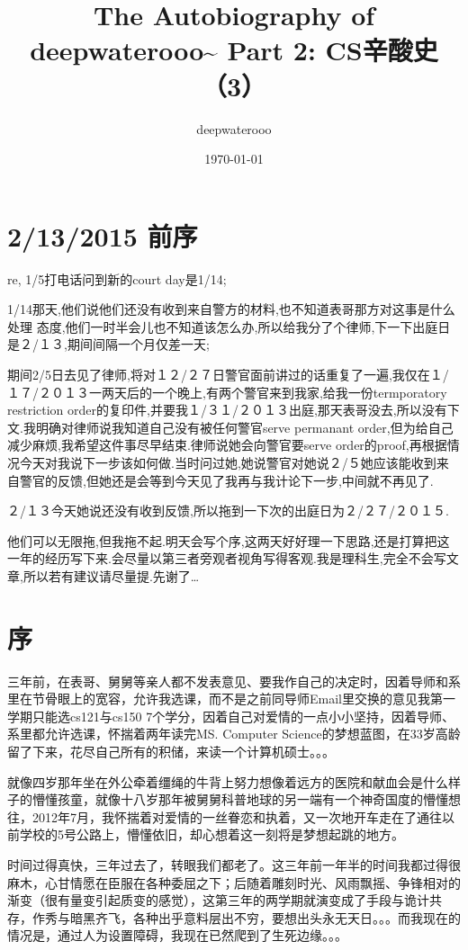 \documentclass[12pt]{book}
\author{deepwaterooo}
\date{\today}
\title{The Autobiography of deepwaterooo\textasciitilde{} \linebreak Part 2: CS辛酸史（3）}
\begin{document}
\maketitle
\tableofcontents


\chapter{2/13/2015 前序}
\label{sec-1}

re, 1/5打电话问到新的court day是1/14;

1/14那天,他们说他们还没有收到来自警方的材料,也不知道表哥那方对这事是什么处理  态度,他们一时半会儿也不知道该怎么办,所以给我分了个律师,下一下出庭日是２/１３,期间间隔一个月仅差一天;

期间2/5日去见了律师,将对１２/２７日警官面前讲过的话重复了一遍,我仅在１/１７/２０１３一两天后的一个晚上,有两个警官来到我家,给我一份termporatory restriction order的复印件,并要我１/３１/２０１３出庭,那天表哥没去,所以没有下文.我明确对律师说我知道自己没有被任何警官serve permanant order,但为给自己减少麻烦,我希望这件事尽早结束.律师说她会向警官要serve order的proof,再根据情况今天对我说下一步该如何做.当时问过她,她说警官对她说２/５她应该能收到来自警官的反馈,但她还是会等到今天见了我再与我计论下一步,中间就不再见了.

２/１３今天她说还没有收到反馈,所以拖到一下次的出庭日为２/２７/２０１５.

他们可以无限拖,但我拖不起.明天会写个序,这两天好好理一下思路,还是打算把这一年的经历写下来.会尽量以第三者旁观者视角写得客观.我是理科生,完全不会写文章,所以若有建议请尽量提.先谢了\ldots{}

\chapter{序}
\label{sec-2}

三年前，在表哥、舅舅等亲人都不发表意见、要我作自己的决定时，因着导师和系里在节骨眼上的宽容，允许我选课，而不是之前同导师Email里交换的意见我第一学期只能选cs121与cs150 7个学分，因着自己对爱情的一点小小坚持，因着导师、系里都允许选课，怀揣着两年读完MS. Computer Science的梦想蓝图，在33岁高龄留了下来，花尽自己所有的积储，来读一个计算机硕士。。。

就像四岁那年坐在外公牵着缰绳的牛背上努力想像着远方的医院和献血会是什么样子的懵懂孩童，就像十八岁那年被舅舅科普地球的另一端有一个神奇国度的懵懂想往，2012年7月，我怀揣着对爱情的一丝眷恋和执着，又一次地开车走在了通往以前学校的5号公路上，懵懂依旧，却心想着这一刻将是梦想起跳的地方。

时间过得真快，三年过去了，转眼我们都老了。这三年前一年半的时间我都过得很麻木，心甘情愿在臣服在各种委屈之下；后随着雕刻时光、风雨飘摇、争锋相对的渐变（很有量变引起质变的感觉），这第三年的两学期就演变成了手段与诡计共存，作秀与暗黑齐飞，各种出乎意料层出不穷，要想出头永无天日。。。而我现在的情况是，通过人为设置障碍，我现在已然爬到了生死边缘。。。
\end{document}
